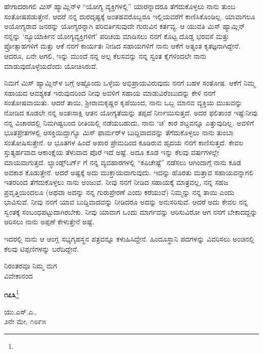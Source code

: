 ಹೇಗಾದರಾಗಲಿ ಮಿಸ್ ಹ್ಯಾಮ್ಲಿನ್‌ಳ ``ಯೋಗ್ಯ ವ್ಯಕ್ತಿಗಳಲ್ಲಿ'' ಯಾರನ್ನಾದರೂ ತೆಗೆದುಕೊಳ್ಳಲು ನಾನು ತುಂಬ ಸಂತೋಷಪಡುತ್ತೇನೆ. ಆದರೆ ನನ್ನ ದುರದೃಷ್ಟಕ್ಕೆ ಅಂತಹವರೊಬ್ಬರೂ ಇಲ್ಲಿಯವರೆಗೆ ಕಾಣಿಸಿಕೊಂಡಿಲ್ಲ. ಯಾವಾಗಲೂ ಅಯೋಗ್ಯರಾದ ಜನರನ್ನು ಯೋಗ್ಯರನ್ನಾಗಿ ಪರಿವರ್ತಿಸುವುದೇ ಗುರುವಿನ ಕರ್ತವ್ಯ. ಆ ಯುವತಿ ಮಿಸ್ ಹ್ಯಾಮ್ಲಿನ್ ನನ್ನನ್ನು `ನ್ಯೂಯಾರ್ಕಿನ ಯೋಗ್ಯವ್ಯಕ್ತಿಗಳಿಗೆ' ಪರಿಚಯ ಮಾಡಿಸಲು ನನಗೆ ಕೊಟ್ಟ ದೊಡ್ಡ ಭರವಸೆ ಮತ್ತು ಪ್ರೋತ್ಸಾಹಗಳಿಗೆ ಮತ್ತು ಆಕೆ ನನಗೆ ಕಾರ್ಯತಃ ನೀಡಿದ ಸಹಾಯಗಳಿಗೆ ನಾನು ಆಕೆಗೆ ಅತ್ಯಂತ ಕೃತಜ್ಞನಾಗಿದ್ದೇನೆ. ಆದರೂ, ಏನೇ ಆಗಲಿ, ಇನ್ನು ಮುಂದೆ ನನ್ನ ಅಲ್ಪ ಕೆಲಸವನ್ನು ನನ್ನ ಸ್ವಂತ ಕೈಗಳಿಂದಲೇ ನಾನು ಮಾಡುವುದೊಳ್ಳೆಯದೆಂದು ಯೋಚಿಸಿರುವೆ.

ನಿಮಗೆ ಮಿಸ್ ಹ್ಯಾಮ್ಲಿನ್‌ಳ ಬಗ್ಗೆ ಅಷ್ಟೊಂದು ಒಳ್ಳೆಯ ಅಭಿಪ್ರಾಯವಿರುವುದು ನನಗೆ ಬಹಳ ಸಂತೋಷ. ಆಕೆಗೆ ನಿಮ್ಮ ಸಹಾಯದ ಆವಶ್ಯಕತೆ ಇರುವುದರಿಂದ ನೀವು ಅವಳಿಗೆ ಸಹಾಯ ಮಾಡುವಿರೆಂಬುದನ್ನು ಕೇಳಿ ನನಗೆ ಸಂತೋಷವಾಯಿತು. ಆದರೆ ತಾಯಿ, ಶ‍್ರೀರಾಮಕೃಷ್ಣರ ಕೃಪೆಯಿಂದ, ನಾನು ಒಬ್ಬ ಮಾನವ ವ್ಯಕ್ತಿಯ ಮುಖವನ್ನು ನೋಡಿದ ಕೂಡಲೇ ನನ್ನ ಅಂತಃಸಾಕ್ಷಿ ಆತನ ಯೋಗ್ಯತೆಯನ್ನು ತಪ್ಪದೆ ನಿರ್ಣಯಿಸುತ್ತದೆ. ಅದರ ಫಲಿತಾಂಶ ಇಷ್ಟೆ:ನೀವು ನನ್ನ ವಿಚಾರದಲ್ಲಿ ನಿಮಗಿಷ್ಟಬಂದ ರೀತಿಯಲ್ಲಿ ನಡೆಯಬಹುದು, ನಾನು `ಚ' ಕಾರ ಶಬ್ದವನ್ನೂ ಎತ್ತುವುದಿಲ್ಲ. ಅವಳಿಗೆ ಭೂತಪ್ರೇತಗಳಲ್ಲಿ ಆಸಕ್ತಿಯಿದ್ದಾಗ್ಯೂ ಮಿಸ್ ಫಾರ್ಮರ್‌ಳ ಬುದ್ದಿವಾದವನ್ನು ತೆಗೆದುಕೊಳ್ಳಲು ನಾನು ತುಂಬಾ ಸಂತೋಷಿಸುತ್ತೇನೆ. ಆ ಭೂತಗಳ ಹಿಂದೆ ಅಪಾರ ಪ್ರೇಮದಿಂದ ಕೂಡಿರುವ ಹೃದಯ ನನಗೆ ಕಾಣಿಸುತ್ತದೆ. ಕೇವಲ ಸ್ತುತ್ಯರ್ಹವಾದ ಆಕಾಂಕ್ಷೆಯ ತೆಳುವಾದ ಪೊರೆ ಇದೆ ಅಷ್ಟೆ. ಅದೂ ಕೂಡ ಇನ್ನು ಕೆಲವು ವರ್ಷಗಳಲ್ಲೇ ಮಾಯವಾಗುತ್ತದೆ. ಲ್ಯಾಂಡ್ಸ್‌ಬರ್ಗ್ ಗೆ ನನ್ನ ವ್ಯವಹಾರಗಳಲ್ಲಿ “ಕಪಿಚೇಷ್ಟೆ'' ನಡೆಸಲು ಆಗಿಂದಾಗ್ಗೆ ನಾನು ಕೂಡ ಅವಕಾಶ ಕೊಡುತ್ತೇನೆ. ಆದರೆ ಅಷ್ಟಕ್ಕೆ ಅದು ಮುಕ್ತಾಯವಾಗುವುದು. ಇದನ್ನು ಹೊರತು ಮತ್ತಾವ ಸಹಾಯವನ್ನಾಗಲಿ ಇತರರಿಂದ ತೆಗೆದುಕೊಳ್ಳಲು ನಾನು ಅಂಜುವೆ. ನೀವು ನನಗೆ ನೀಡಿದ ಸಹಾಯಕ್ಕೆ ಮಾತ್ರವಲ್ಲ, ನನ್ನ ಸಹಜ ಪ್ರವೃತ್ತಿಯಿಂದಲೂ (ಅಥವಾ ಅದನ್ನು ನನ್ನ ಗುರುಪ್ರೇರಣೆ ಎಂದು ಕರೆಯುವೆ) ನಿಮ್ಮನ್ನು ನನ್ನ ತಾಯಿ ಎಂದು ಭಾವಿಸುವೆ. ನೀವು ನನಗೆ ಯಾವ ಬುದ್ದಿವಾದವನ್ನು ನೀಡಿದರೂ ಅದನ್ನು ಅನುಸರಿಸುವೆ. ಆದರೆ ಅದು ಕೇವಲ ನನ್ನ ಸ್ವಂತಕ್ಕೆ ಸಂಬಂಧಪಟ್ಟುದಾಗಿರಬೇಕು. ನೀವು ಯಾವಾಗ ಒಂದು ಮಾರ್ಗವನ್ನು ಆರಿಸುವಿರೋ ಆಗ ನನಗೆ ಬೇಕಾದದ್ದನ್ನು ಆರಿಸಲು ನಾನು ಅಪ್ಪಣೆ ಕೇಳುತ್ತೇನೆ ಅಷ್ಟೆ.

ಇದರಲ್ಲಿ ನಾನು ಆ ಆಂಗ್ಲ ಸಭ್ಯಗೃಹಸ್ಥನ ಪತ್ರವನ್ನೂ ಕಳುಹಿಸಿದ್ದೇನೆ. ಹಿಂದೂಸ್ಥಾನಿ ಪದಗಳನ್ನು ವಿವರಿಸಲು ಅಂಚಿನಲ್ಲಿ ಕೆಲವು ಟಿಪ್ಪಣಿಗಳನ್ನು ಬರೆದಿದ್ದೇನೆ.

\vspace{-0.4cm}

{\flushright
ನಿರಂತರವೂ ನಿಮ್ಮ ಮಗ\\ವಿವೇಕಾನಂದ\par}

\begin{center}
\textbf{೧೭೩}\footnote{}
\end{center}

\begin{flushright}
ಯು.ಎಸ್.ಎ.,\\೨ನೇ ಮೇ, ೧೮೯೫
\end{flushright}


